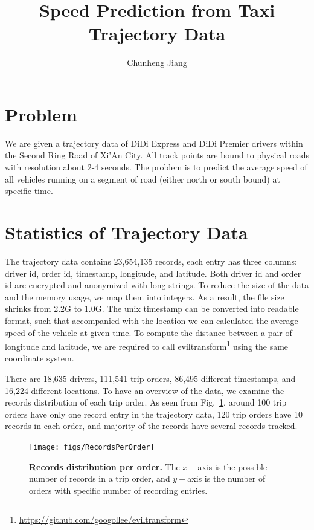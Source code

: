 \documentclass[12pt]{article}
\title{Speed Prediction from Taxi Trajectory Data}
\author{Chunheng Jiang}
\numberwithin{table}{section}
\newenvironment{affiliations}{
    \setcounter{enumi}{1}
    \setlength{\parindent}{0in}
    \slshape\sloppy
    \begin{list}{\upshape$^{\arabic{enumi}}$}{
        \usecounter{enumi}
        \setlength{\leftmargin}{0in}
        \setlength{\topsep}{0in}
        \setlength{\labelsep}{0in}
        \setlength{\labelwidth}{0in}
        \setlength{\listparindent}{0in}
        \setlength{\itemsep}{0ex}
        \setlength{\parsep}{0in}
        }
    }{\end{list}\par\vspace{12pt}}
\begin{document}
\maketitle
\noindent


\section*{Problem}
We are given a trajectory data of DiDi Express and DiDi Premier drivers within the Second Ring Road of Xi'An City. 
All track points are bound to physical roads with resolution about 2-4 seconds. The problem is to predict the average speed of all vehicles running on a segment of road (either north or south bound) at specific time. 

\section*{Statistics of Trajectory Data}
The trajectory data contains 23,654,135 records, each entry has three columns: driver id, order id, timestamp, longitude, and latitude. Both driver id and order id are encrypted and anonymized with long strings. To reduce the size of the data and the memory usage, we map them into integers. As a result, the file size shrinks from 2.2G to 1.0G. The unix timestamp can be converted into readable format, such that accompanied with the location we can calculated the average speed of the vehicle at given time. To compute the distance between a pair of longitude and latitude, we are required to call eviltransform\footnote{\href{https://github.com/googollee/eviltransform}{https://github.com/googollee/eviltransform}} using the same coordinate system.

There are 18,635 drivers, 111,541 trip orders, 86,495 different timestamps, and 16,224 different locations. To have an overview of the data, we examine the records distribution of each trip order. As seen from Fig.~\ref{fig:recordsperorder}, around 100 trip orders have only one record entry in the trajectory data, 120 trip orders have 10 records in each order, and majority of the records have several records tracked.

\begin{figure}[!h]
\centering
\texttt{[image: figs/RecordsPerOrder]}
\caption{\textbf{Records distribution per order.} The $x-$axis is the possible number of records in a trip order, and $y-$axis is the number of orders with specific number of recording entries.} 
\label{fig:recordsperorder}
\end{figure}
\end{document}
